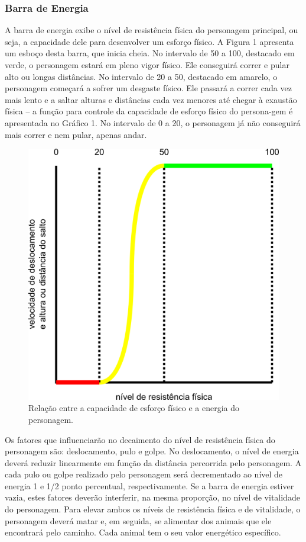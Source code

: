 \subsubsection{Barra de Energia}
A barra de energia exibe o nível de resistência física do personagem principal, 
ou seja, a capacidade dele para desenvolver um esforço físico. A Figura 1 apresenta 
um esboço desta barra, que inicia cheia. No intervalo de 50 a 100, destacado em 
verde, o personagem estará em pleno vigor físico. Ele conseguirá correr e pular 
alto ou longas distâncias. No intervalo de 20 a 50, destacado em amarelo, o 
personagem começará a sofrer um desgaste físico. Ele passará a correr cada vez 
mais lento e a saltar alturas e distâncias cada vez menores até chegar à exaustão 
física – a função para controle da capacidade de esforço físico do persona-gem é 
apresentada no Gráfico 1. No intervalo de 0 a 20, o personagem já não conseguirá 
mais correr e nem pular, apenas andar.

\begin{figure}[!ht]
 \centering
 \includegraphics[scale=0.6]{VelocidadeDeDeslocamentoEPulo.png}
 \caption{Relação entre a capacidade de esforço físico e a energia do personagem.}
 \label{img:reason}
\end{figure}

Os fatores que influenciarão no decaimento do nível de resistência física 
do personagem são: deslocamento, pulo e golpe. No deslocamento, o nível de 
energia deverá reduzir linearmente em função da distância percorrida pelo 
personagem. A cada pulo ou golpe realizado pelo personagem será decrementado 
ao nível de energia 1 e 1/2 ponto percentual, respectivamente. Se a barra de 
energia estiver vazia, estes fatores deverão interferir, na mesma proporção, 
no nível de vitalidade do personagem. Para elevar ambos os níveis de 
resistência física e de vitalidade, o personagem deverá matar e, em 
seguida, se alimentar dos animais que ele encontrará pelo caminho. Cada 
animal tem o seu valor energético específico.

